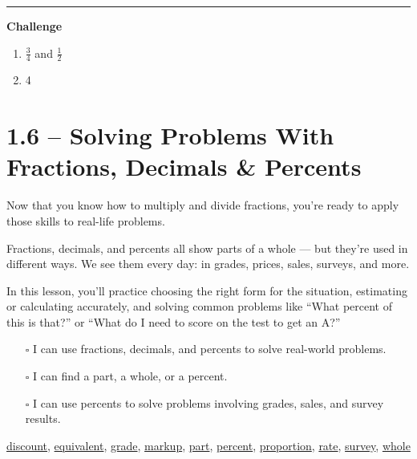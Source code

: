 \documentclass[
  letterpaper,
  DIV=11,
  numbers=noendperiod]{scrreprt}
\providecommand{\tightlist}{%
  \setlength{\itemsep}{0pt}\setlength{\parskip}{0pt}}
\begin{document}
\begin{center}\rule{0.5\linewidth}{0.5pt}\end{center}

\textbf{Challenge}

\begin{enumerate}
\def\labelenumi{\arabic{enumi}.}
\setcounter{enumi}{4}
\item
  \(\frac{3}{4}\) and \(\frac{1}{2}\)
\item
  4
\end{enumerate}

\chapter*{1.6 -- Solving Problems With Fractions, Decimals \&
Percents}\label{solving-problems-with-fractions-decimals-percents}


Now that you know how to multiply and divide fractions, you're ready to
apply those skills to real-life problems.

Fractions, decimals, and percents all show parts of a whole --- but
they're used in different ways. We see them every day: in grades,
prices, sales, surveys, and more.

In this lesson, you'll practice choosing the right form for the
situation, estimating or calculating accurately, and solving common
problems like ``What percent of this is that?'' or ``What do I need to
score on the test to get an A?''

\begin{itemize}
\tightlist
\item[$\square$]
  I can use fractions, decimals, and percents to solve real-world
  problems.
\item[$\square$]
  I can find a part, a whole, or a percent.
\item[$\square$]
  I can use percents to solve problems involving grades, sales, and
  survey results.
\end{itemize}

\href{./glossary.html\#glossary-discount}{discount},
\href{./glossary.html\#glossary-equivalent}{equivalent},
\href{./glossary.html\#glossary-grade}{grade},
\href{./glossary.html\#glossary-markup}{markup},
\href{./glossary.html\#glossary-part}{part},
\href{./glossary.html\#glossary-percent}{percent},
\href{./glossary.html\#glossary-proportion}{proportion},
\href{./glossary.html\#glossary-rate}{rate},
\href{./glossary.html\#glossary-survey}{survey},
\href{./glossary.html\#glossary-whole}{whole}
\end{document}
